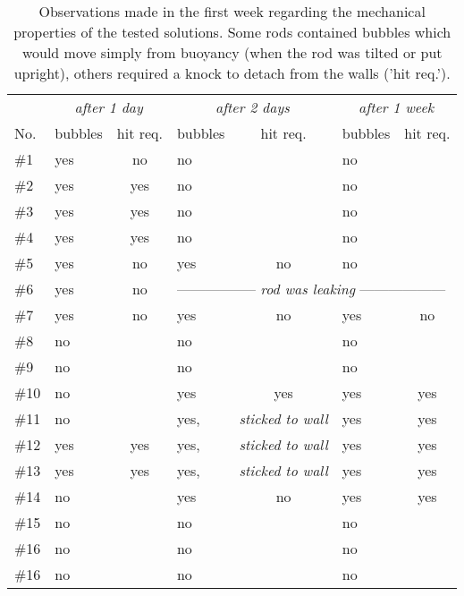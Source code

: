 \begin{table}[tbh!]
\centering
\caption[Observations made in the first week regarding the mechanical properties of the tested solutions.]{Observations made in the first week regarding the mechanical properties of the tested solutions. Some rods contained bubbles which would move simply from buoyancy (when the rod was tilted or put upright), others required a knock to detach from the walls ('hit req.').}
\begin{tabular}{l|lc|lc|lc}
    & \multicolumn{2}{c}{\textit{after 1 day}} 	& \multicolumn{2}{c}{\textit{after 2 days}}	& \multicolumn{2}{c}{\textit{after 1 week}}	\\ 
No. & bubbles	& hit req.	& bubbles 	& hit req.	& bubbles 	& hit req.	\\
\toprule
\#1   & yes	& no		& no		&		& no		&		\\
\#2   & yes	& yes		& no		&		& no		&		\\
\#3   & yes	& yes		& no		&		& no		&		\\
\#4   & yes	& yes		& no		&		& no		&		\\
\#5   & yes	& no		& yes		& no		& no		&		\\
\#6   & yes	& no		& \multicolumn{4}{l}{-----------------\textit{ rod was leaking }------------------}	\\
\#7   & yes	& no		& yes		& no		& yes		& no		\\
\#8   & no	&		& no		&		& no		&		\\
\#9   & no	&		& no		&		& no		&		\\
\#10  & no\footnotemark	&		& yes		& yes		& yes		& yes		\\
\#11  & no	&		& yes,		& \textit{sticked to wall} &	 yes	& yes\\
\#12  & yes	& yes		& yes,		& \textit{sticked to wall} &	 yes	& yes\\
\#13  & yes	& yes		& yes,		& \textit{sticked to wall} &	 yes	& yes\\
\#14  & no	&   		& yes		& no		& yes		& yes		\\
\#15  & no	&   		& no		&		& no		&		\\
\#16  & no	&   		& no		&		& no		&		\\
\#16  & no	&   		& no		&		& no		&		\\
\bottomrule
\end{tabular}
\label{tab:bubbles1}
\end{table}

\clearpage

